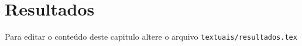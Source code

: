 \chapter{Resultados}

Para editar o conteúdo deste capitulo altere o arquivo \verb|textuais/resultados.tex| 